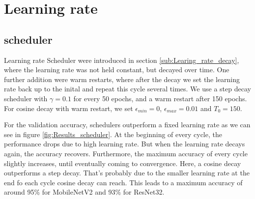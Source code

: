\section{Learning rate}\label{res:Learning_rate}
\subsection{scheduler}\label{res:Scheduler}
Learning rate Scheduler were introduced in section \ref{sub:Learing_rate_decay},
where the learning rate was not held constant, but decayed over time. One
further addition were warm restarts, where after the decay we set the learning
rate back up to the inital and repeat this cycle several times. We use a step
decay scheduler with $\gamma = 0.1$ for every 50 epochs, and a warm restart
after 150 epochs. For cosine decay with warm restart, we set $\epsilon_{min}=0$,
$\epsilon_{max}=0.01$ and $T_0=150$.


For the validation accuracy, schedulers outperform a fixed learning rate as we
can see in figure \ref{fig:Results_scheduler}. At the beginning of every cycle,
the performance drops due to high learning rate. But when the learning rate
decays again, the accuracy recovers. Furthermore, the maximum accuracy of every
cycle slightly increases, until eventually coming to convergence. Here, a cosine
decay outperforms a step decay. That's probably due to the smaller learning rate
at the end fo each cycle cosine decay can reach. This leads to a maximum
accuracy of around 95\% for MobileNetV2 and 93\% for ResNet32.


